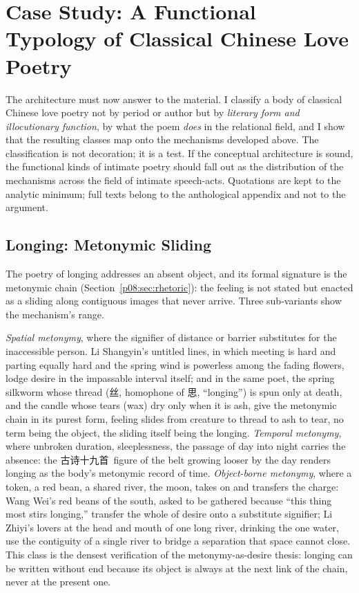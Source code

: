 \section{Case Study: A Functional Typology of Classical Chinese Love Poetry}\label{p08:sec:case}

The architecture must now answer to the material. I classify a body of classical Chinese love poetry not by period or author but by \emph{literary form and illocutionary function}, by what the poem \emph{does} in the relational field, and I show that the resulting classes map onto the mechanisms developed above. The classification is not decoration; it is a test. If the conceptual architecture is sound, the functional kinds of intimate poetry should fall out as the distribution of the mechanisms across the field of intimate speech-acts. Quotations are kept to the analytic minimum; full texts belong to the anthological appendix and not to the argument.

\subsection{Longing: Metonymic Sliding}\label{p08:sec:case-longing}

The poetry of longing addresses an absent object, and its formal signature is the metonymic chain (Section~\ref{p08:sec:rhetoric}): the feeling is not stated but enacted as a sliding along contiguous images that never arrive. Three sub-variants show the mechanism's range.

\emph{Spatial metonymy}, where the signifier of distance or barrier substitutes for the inaccessible person. Li Shangyin's untitled lines, in which meeting is hard and parting equally hard and the spring wind is powerless among the fading flowers, lodge desire in the impassable interval itself; and in the same poet, the spring silkworm whose thread (\cjkfont 丝\normalfont, homophone of \cjkfont 思\normalfont, ``longing'') is spun only at death, and the candle whose tears (wax) dry only when it is ash, give the metonymic chain in its purest form, feeling slides from creature to thread to ash to tear, no term being the object, the sliding itself being the longing. \emph{Temporal metonymy}, where unbroken duration, sleeplessness, the passage of day into night carries the absence: the \cjkfont 古诗十九首\normalfont\ figure of the belt growing looser by the day renders longing as the body's metonymic record of time. \emph{Object-borne metonymy}, where a token, a red bean, a shared river, the moon, takes on and transfers the charge: Wang Wei's red beans of the south, asked to be gathered because ``this thing most stirs longing,'' transfer the whole of desire onto a substitute signifier; Li Zhiyi's lovers at the head and mouth of one long river, drinking the one water, use the contiguity of a single river to bridge a separation that space cannot close. This class is the densest verification of the metonymy-as-desire thesis: longing can be written without end because its object is always at the next link of the chain, never at the present one.

